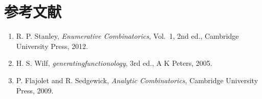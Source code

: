 \documentclass[a5paper,10pt,onecolumn]{jsarticle}
\theoremstyle{mathnotetheorem}
\begin{document}
\section*{参考文献}
\begin{enumerate}
\item R. P. Stanley, \textit{Enumerative Combinatorics}, Vol.~1, 2nd ed., Cambridge University Press, 2012.
\item H. S. Wilf, \textit{generatingfunctionology}, 3rd ed., A K Peters, 2005.
\item P. Flajolet and R. Sedgewick, \textit{Analytic Combinatorics}, Cambridge University Press, 2009.
\end{enumerate}
\end{document}
